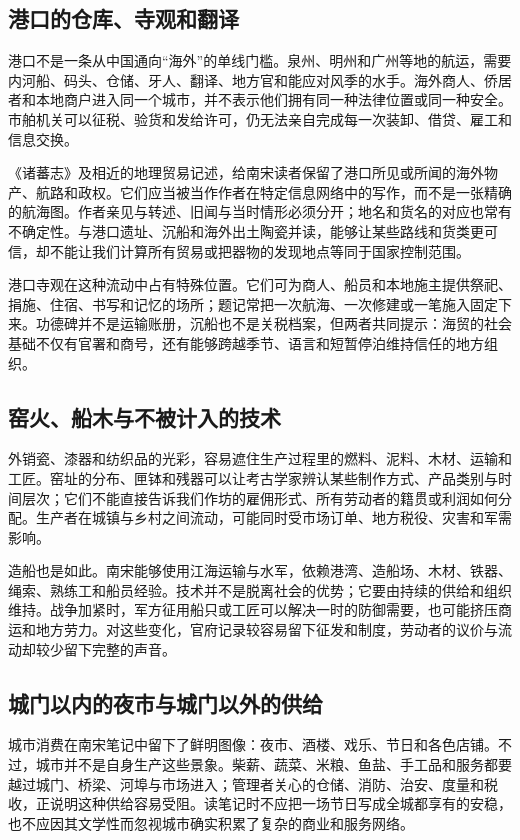 \subsection{港口的仓库、寺观和翻译}

港口不是一条从中国通向“海外”的单线门槛。泉州、明州和广州等地的航运，需要内河船、码头、仓储、牙人、翻译、地方官和能应对风季的水手。海外商人、侨居者和本地商户进入同一个城市，并不表示他们拥有同一种法律位置或同一种安全。市舶机关可以征税、验货和发给许可，仍无法亲自完成每一次装卸、借贷、雇工和信息交换。

《诸蕃志》及相近的地理贸易记述，给南宋读者保留了港口所见或所闻的海外物产、航路和政权。它们应当被当作作者在特定信息网络中的写作，而不是一张精确的航海图。作者亲见与转述、旧闻与当时情形必须分开；地名和货名的对应也常有不确定性。与港口遗址、沉船和海外出土陶瓷并读，能够让某些路线和货类更可信，却不能让我们计算所有贸易或把器物的发现地点等同于国家控制范围。

港口寺观在这种流动中占有特殊位置。它们可为商人、船员和本地施主提供祭祀、捐施、住宿、书写和记忆的场所；题记常把一次航海、一次修建或一笔施入固定下来。功德碑并不是运输账册，沉船也不是关税档案，但两者共同提示：海贸的社会基础不仅有官署和商号，还有能够跨越季节、语言和短暂停泊维持信任的地方组织。

\subsection{窑火、船木与不被计入的技术}

外销瓷、漆器和纺织品的光彩，容易遮住生产过程里的燃料、泥料、木材、运输和工匠。窑址的分布、匣钵和残器可以让考古学家辨认某些制作方式、产品类别与时间层次；它们不能直接告诉我们作坊的雇佣形式、所有劳动者的籍贯或利润如何分配。生产者在城镇与乡村之间流动，可能同时受市场订单、地方税役、灾害和军需影响。

造船也是如此。南宋能够使用江海运输与水军，依赖港湾、造船场、木材、铁器、绳索、熟练工和船员经验。技术并不是脱离社会的优势；它要由持续的供给和组织维持。战争加紧时，军方征用船只或工匠可以解决一时的防御需要，也可能挤压商运和地方劳力。对这些变化，官府记录较容易留下征发和制度，劳动者的议价与流动却较少留下完整的声音。

\subsection{城门以内的夜市与城门以外的供给}

城市消费在南宋笔记中留下了鲜明图像：夜市、酒楼、戏乐、节日和各色店铺。不过，城市并不是自身生产这些景象。柴薪、蔬菜、米粮、鱼盐、手工品和服务都要越过城门、桥梁、河埠与市场进入；管理者关心的仓储、消防、治安、度量和税收，正说明这种供给容易受阻。读笔记时不应把一场节日写成全城都享有的安稳，也不应因其文学性而忽视城市确实积累了复杂的商业和服务网络。

